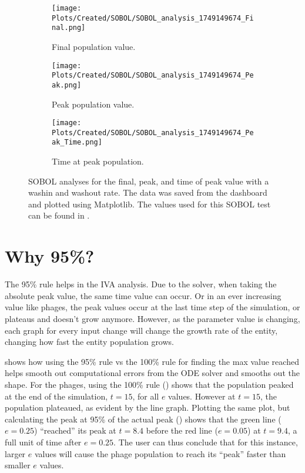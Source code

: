 \begin{figure}[ht!]
    \centering
    \begin{subfigure}{0.32\linewidth}
        \centering
        \captionsetup{width=1\linewidth}
        \texttt{[image: Plots/Created/SOBOL/SOBOL\_analysis\_1749149674\_Final.png]}
        \caption{
            Final population value. 
        }
        \label{fig:created:SOBOL_final}
    \end{subfigure}
    \hfill
    \begin{subfigure}{0.32\linewidth}
        \centering
        \captionsetup{width=1\linewidth}
        \texttt{[image: Plots/Created/SOBOL/SOBOL\_analysis\_1749149674\_Peak.png]}
        \caption{
            Peak population value. 
        }
        \label{fig:created:SOBOL_peak}
    \end{subfigure}
    \hfill
    \begin{subfigure}{0.32\linewidth}
        \centering
        \captionsetup{width=1\linewidth}
        \texttt{[image: Plots/Created/SOBOL/SOBOL\_analysis\_1749149674\_Peak\_Time.png]}
        \caption{
            Time at peak population. 
        }
        \label{fig:created:SOBOL_peak_time}
    \end{subfigure}
    \caption{
        SOBOL analyses for the final, peak, and time of peak value with a washin and washout rate. 
        The data was saved from the dashboard and plotted using Matplotlib. 
        The values used for this SOBOL test can be found in . 
    }
    \label{fig:created:SOBOL_analyses}
\end{figure}

\section{Why 95\%? }
\label{sec:appendixF:why_95}
The 95\% rule helps in the IVA analysis. 
Due to the solver, when taking the absolute peak value, the same time value can occur. 
Or in an ever increasing value like phages, the peak values occur at the last time step of the simulation, or plateaus and doesn't grow anymore. 
However, as the parameter value is changing, each graph for every input change will change the growth rate of the entity, changing how fast the entity population grows. 

 shows how using the 95\% rule vs the 100\% rule for finding the max value reached helps smooth out computational errors from the ODE solver and smooths out the shape. 
For the phages, using the 100\% rule () shows that the population peaked at the end of the simulation, $t=15$, for all $e$ values. 
However at $t=15$, the population plateaued, as evident by the line graph. 
Plotting the same plot, but calculating the peak at 95\% of the actual peak () shows that the green line ($e=0.25$) “reached” its peak at $t=8.4$ before the red line ($e=0.05$) at $t=9.4$, a full unit of time after $e=0.25$. 
The user can thus conclude that for this instance, larger $e$ values will cause the phage population to reach its “peak” faster than smaller $e$ values. 

